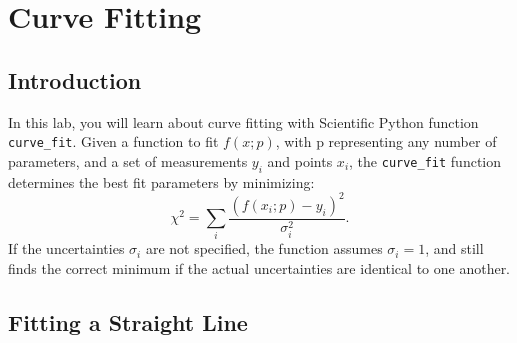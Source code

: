 \chapter{Curve Fitting}

\section{Introduction}

In this lab, you will learn about curve fitting with Scientific Python
function {\tt curve{\_}fit}.  Given a function to fit $f(x;p)$, with p
representing any number of parameters, and a set of measurements $y_i$ and points $x_i$,
the {\tt curve{\_}fit} function determines the best fit parameters by
minimizing:
\begin{displaymath}
\chi^2 = \sum_i \frac{(f(x_i;p) - y_i) ^2}{\sigma_i^2}.
\end{displaymath}
If the uncertainties $\sigma_i$ are not specified, the function
assumes $\sigma_i = 1$, and still finds the correct minimum
if the actual uncertainties are identical to one another.

\section{Fitting a Straight Line}

